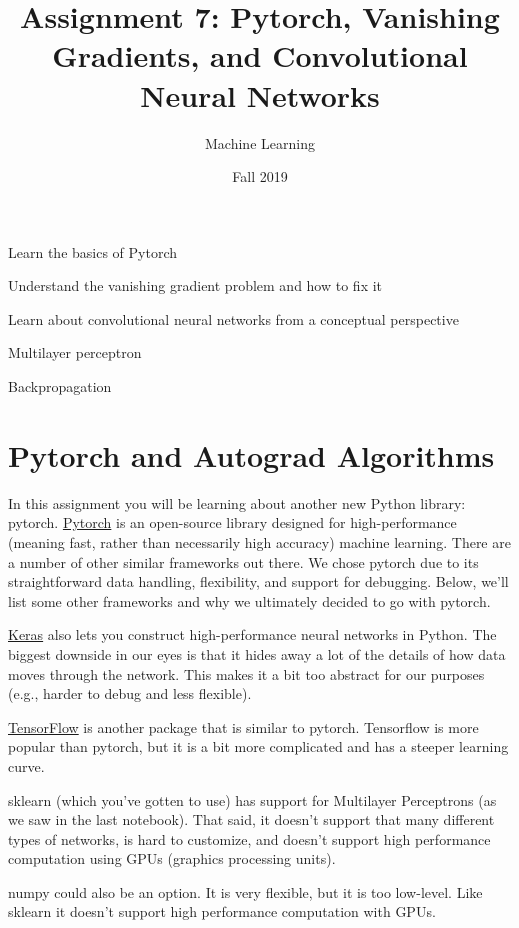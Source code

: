 \documentclass[assignment07_Solutions]{subfiles}
\title{Assignment 7: Pytorch, Vanishing Gradients, and Convolutional Neural Networks}
\author{Machine Learning}
\date{Fall 2019}
\begin{document}
\maketitle
\thispagestyle{firstpage}


\begin{learningobjectives}
\bi
\item Learn the basics of Pytorch
\item Understand the vanishing gradient problem and how to fix it
\item Learn about convolutional neural networks from a conceptual perspective
\ei
\end{learningobjectives}

\begin{priorknowledge}
\bi
\item Multilayer perceptron
\item Backpropagation
\ei
\end{priorknowledge}

\section{Pytorch and Autograd Algorithms}

In this assignment you will be learning about another new Python library: pytorch.  \href{https://pytorch.org/}{Pytorch} is an open-source library designed for high-performance (meaning fast, rather than necessarily high accuracy) machine learning.  There are a number of other similar frameworks out there.  We chose pytorch due to its straightforward data handling, flexibility, and support for debugging.  Below, we'll list some other frameworks and why we ultimately decided to go with pytorch.

\bi
\item \href{https://keras.io/}{Keras} also lets you construct high-performance neural networks in Python.  The biggest downside in our eyes is that it hides away a lot of the details of how data moves through the network.  This makes it a bit too abstract for our purposes (e.g., harder to debug and less flexible).
\item \href{https://www.tensorflow.org/}{TensorFlow} is another package that is similar to pytorch.  Tensorflow is more popular than pytorch, but it is a bit more complicated and has a steeper learning curve.
\item sklearn (which you've gotten to use) has support for Multilayer Perceptrons (as we saw in the last notebook).  That said, it doesn't support that many different types of networks, is hard to customize, and doesn't support high performance computation using GPUs (graphics processing units).
\item numpy could also be an option.  It is very flexible, but it is too low-level.  Like sklearn it doesn't support high performance computation with GPUs.
\ei
\end{document}
